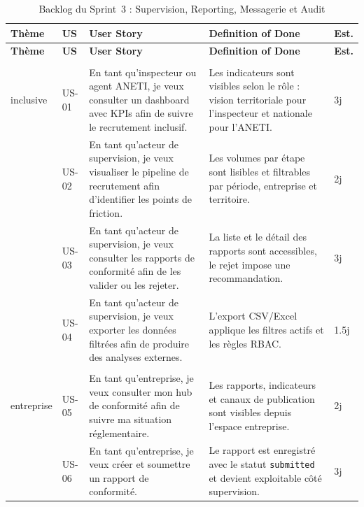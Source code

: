\documentclass[12pt,a4paper]{report}
\begin{document}
\begin{longtable}{|>{\centering\arraybackslash}p{2.7cm}|>{\centering\arraybackslash}p{1.3cm}|>{\raggedright\arraybackslash}p{4.8cm}|>{\raggedright\arraybackslash}p{4.8cm}|>{\centering\arraybackslash}p{1.2cm}|}
\caption{Backlog du Sprint~3 : Supervision, Reporting, Messagerie et Audit}
\label{tab:sprint3_backlog}\\
\hline
\rowcolor{mainblue!15}
\textbf{Thème} & \textbf{US} & \textbf{User Story} & \textbf{Definition of Done} & \textbf{Est.} \\
\hline
\endfirsthead
\hline
\rowcolor{mainblue!15}
\textbf{Thème} & \textbf{US} & \textbf{User Story} & \textbf{Definition of Done} & \textbf{Est.} \\
\hline
\endhead

\multirow{4}{2.7cm}{\centering\textbf{Supervision\\inclusive}}
& US-01 & En tant qu'inspecteur ou agent ANETI, je veux consulter un dashboard avec KPIs afin de suivre le recrutement inclusif. & Les indicateurs sont visibles selon le rôle : vision territoriale pour l'inspecteur et nationale pour l'ANETI. & 3j \\
\cline{2-5}
& US-02 & En tant qu'acteur de supervision, je veux visualiser le pipeline de recrutement afin d'identifier les points de friction. & Les volumes par étape sont lisibles et filtrables par période, entreprise et territoire. & 2j \\
\cline{2-5}
& US-03 & En tant qu'acteur de supervision, je veux consulter les rapports de conformité afin de les valider ou les rejeter. & La liste et le détail des rapports sont accessibles, le rejet impose une recommandation. & 3j \\
\cline{2-5}
& US-04 & En tant qu'acteur de supervision, je veux exporter les données filtrées afin de produire des analyses externes. & L'export CSV/Excel applique les filtres actifs et les règles RBAC. & 1.5j \\
\hline

\multirow{2}{2.7cm}{\centering\textbf{Reporting\\entreprise}}
& US-05 & En tant qu'entreprise, je veux consulter mon hub de conformité afin de suivre ma situation réglementaire. & Les rapports, indicateurs et canaux de publication sont visibles depuis l'espace entreprise. & 2j \\
\cline{2-5}
& US-06 & En tant qu'entreprise, je veux créer et soumettre un rapport de conformité. & Le rapport est enregistré avec le statut \texttt{submitted} et devient exploitable côté supervision. & 3j \\
\hline


\end{longtable}
\end{document}
